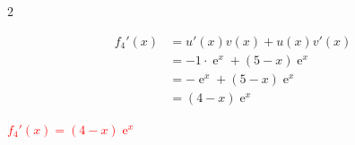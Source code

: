 \documentclass[11pt,a4paper]{article}
\DeclareMathOperator{\e}{e}
\begin{document}
\begin{multicols}{2}
\begin{tcolorbox}[colback=red!5!white,colframe=red!75!black]
{\vspace{4mm}


\[
\begin{aligned}
    f_4'(x) & = u'(x)v(x) + u(x)v'(x)  \\
            & = -1 \cdot \e^x + (5-x)\e^x \\
            & = -\e^x + (5-x)\e^x \\
            & = (4-x)\e^x
\end{aligned}
\]

\vspace{4mm}


\begin{center}
\textbf{\textcolor{red}{$f_4'(x) = (4-x)\e^x$}}
\end{center}

\vspace{24mm}


}
\end{tcolorbox}
\end{multicols}
\end{document}
